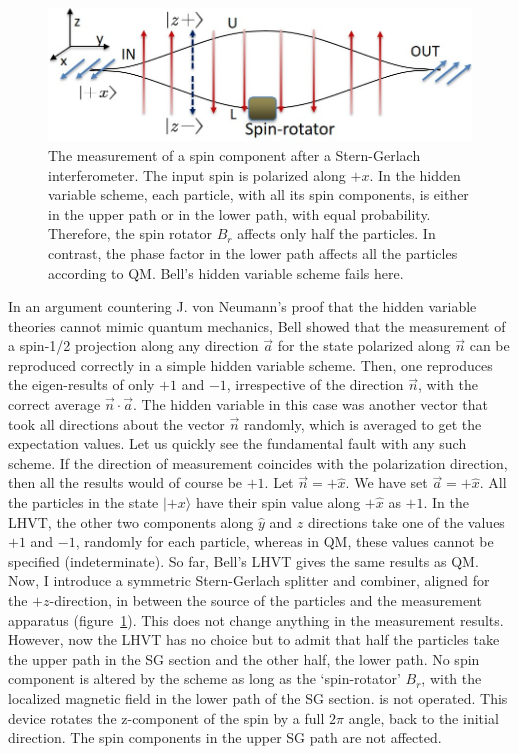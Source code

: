 \begin{figure}[H]
\centering
\includegraphics[scale=0.65]{src/images/chap27/4.jpg}
\caption{The measurement of a spin component after a Stern-Gerlach interferometer. The input spin
is polarized along $+x$. In the hidden variable scheme, each particle, with all its spin components,
is either in the upper path or in the lower path, with equal probability. Therefore, the spin rotator
$B_r$ affects only half the particles. In contrast, the phase factor in the lower path affects all the
particles according to QM. Bell's hidden variable scheme fails here.}\label{ch14-fig4}
\end{figure}
\bigskip


In an argument countering J. von Neumann's proof that the hidden variable theories 
cannot mimic quantum mechanics, Bell showed that the measurement of a spin-1/2 projection
along any direction $\vec{a}$ for the state polarized along $\vec{n}$ can be reproduced correctly in a simple
hidden variable scheme. Then, one reproduces the eigen-results of only $+1$ and $-1$, 
irrespective of the direction $\vec{n}$, with the correct average $\vec{n} \cdot \vec{a}$.
 The hidden variable in this case was another vector that took all directions about the vector $\vec{n}$ randomly, which is averaged to
get the expectation values. Let us quickly see the fundamental fault with any such scheme.
If the direction of measurement coincides with the polarization direction, then all the results
would of course be $+1$. Let $\vec{n} = + \hat{x}$. We have set $\vec{a} = + \hat{x}$. All the particles in the state
$|+x \rangle $ have their spin value along $+ \hat{x}$ as $+1$. In the LHVT, the other two components along
$\hat{y}$ and $\hat{z}$ directions take one of the values $+1$ and $-1$, randomly for each particle, whereas in
QM, these values cannot be specified (indeterminate). So far, Bell's LHVT gives the same
results as QM. Now, I introduce a symmetric Stern-Gerlach splitter and combiner, aligned
for the $+z$-direction, in between the source of the particles and the measurement apparatus
(figure~\ref{ch14-fig4}). This does not change anything in the measurement results. However, now the
LHVT has no choice but to admit that half the particles take the upper path in the SG
section and the other half, the lower path. No spin component is altered by the scheme as
long as the `spin-rotator' $B_r$, with the localized magnetic field in the lower path of the SG
section. is not operated. This device rotates the z-component of the spin by a full $2\pi$ angle, back to the initial
direction. The spin components in the upper SG path are not affected.

